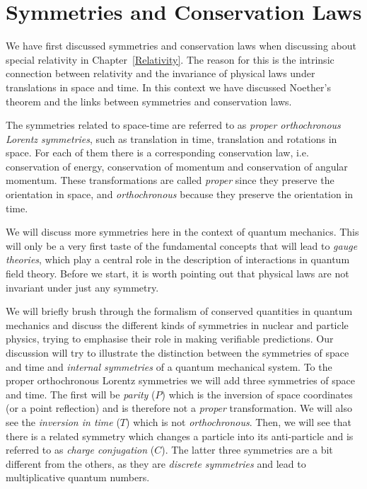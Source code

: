 
\chapter{Symmetries and Conservation Laws}
\label{Symmetries}

We have first discussed symmetries and conservation laws when discussing about special relativity in Chapter~\ref{Relativity}. The reason for this is the intrinsic connection between relativity and the invariance of physical laws under translations in space and time. In this context we have discussed Noether's theorem and the links between symmetries and conservation laws.

The symmetries related to space-time are referred to as \emph{proper orthochronous Lorentz symmetries}, such as translation in time, translation and rotations in space. For each of them there is a corresponding conservation law, i.e.  conservation of energy, conservation of momentum and conservation of angular momentum. These transformations are called \emph{ proper} since they preserve the orientation in space, and \emph{orthochronous} because they preserve the orientation in time. 

We will discuss more symmetries here in the context of quantum mechanics. This will only be a very first taste of the fundamental concepts that will lead to \emph{gauge theories}, which play a central role in the description of interactions in quantum field theory. Before we start, it is worth pointing out that physical laws are not invariant under just any symmetry. 

We will briefly brush through the formalism of conserved quantities in quantum mechanics and discuss the different kinds of symmetries in nuclear and particle physics, trying to emphasise their role in making verifiable predictions. Our discussion will try to illustrate the distinction between the symmetries of space and time and \emph{internal symmetries} of a quantum mechanical system. To the proper orthochronous Lorentz symmetries we will add three symmetries of space and time. The first will be \emph{parity} (\(P\)) which is the inversion of space coordinates (or a point reflection) and is therefore not a \emph{ proper} transformation. We will also see the \emph{inversion in time} (\(T\)) which is not {\it orthochronous}. Then, we will see that there is a related symmetry which changes a particle into its anti-particle and is referred to as  \emph{charge conjugation} (\(C\)). The latter three symmetries are a bit different from the others, as they are \emph{discrete symmetries} and lead to multiplicative quantum numbers. 

